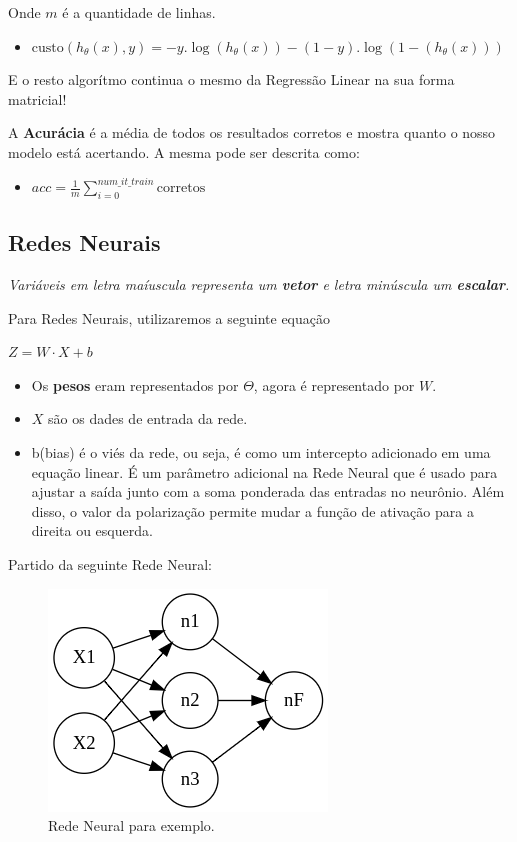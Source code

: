 \documentclass[12pt]{article}
\providecommand{\tightlist}{%
\setlength{\itemsep}{0pt}\setlength{\parskip}{0pt}}
\begin{document}
Onde \(m\) é a quantidade de linhas.

\begin{itemize}
\tightlist
\item
  \(\text{custo}(h_\theta(x),y)=-y.\log(h_\theta(x))-(1-y).\log(1-(h_\theta(x)))\)
\end{itemize}

E o resto algorítmo continua o mesmo da Regressão Linear na sua forma
matricial!

A \textbf{Acurácia} é a média de todos os resultados corretos e mostra
quanto o nosso modelo está acertando. A mesma pode ser descrita como:

\begin{itemize}
\tightlist
\item
  \(acc=\frac{1}{m}\sum\limits_{i=0}^{num\_it\_train}\text{corretos}\)
\end{itemize}

\hypertarget{redes-neurais}{%
\subsection{\texorpdfstring{\textbf{Redes
Neurais}}{Redes Neurais}}\label{redes-neurais}}

\emph{Variáveis em letra maíuscula representa um \textbf{vetor} e letra
minúscula um \textbf{escalar}.}

Para Redes Neurais, utilizaremos a seguinte equação

\(Z = W \cdot X + b\)

\begin{itemize}
\item
  Os \textbf{pesos} eram representados por \(\Theta\), agora é
  representado por \(W\).
\item
  \(X\) são os dades de entrada da rede.
\item
  b(bias) é o viés da rede, ou seja, é como um intercepto adicionado em
  uma equação linear. É um parâmetro adicional na Rede Neural que é
  usado para ajustar a saída junto com a soma ponderada das entradas no
  neurônio. Além disso, o valor da polarização permite mudar a função de
  ativação para a direita ou esquerda.
\end{itemize}

Partido da seguinte Rede Neural:

\begin{figure}
	\centering
	\includegraphics[width=.4\linewidth]{imgs/graphviz.png}
	\caption{Rede Neural para exemplo.}
\end{figure}
\end{document}
